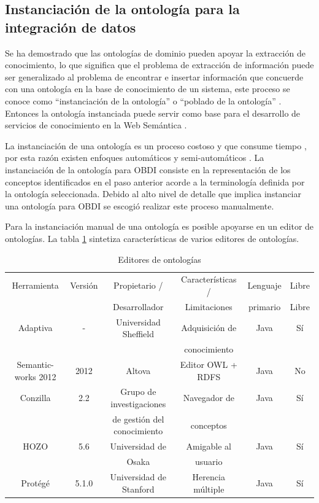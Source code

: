\subsection{Instanciación de la ontología para la integración de datos}

Se ha demostrado que las ontologías de dominio pueden apoyar la extracción de conocimiento, lo que significa que el problema de extracción de información puede ser generalizado al problema de encontrar e insertar información que concuerde con una ontología en la base de conocimiento de un sistema, este proceso se conoce como ``instanciación de la ontología'' o ``poblado de la ontología'' \citep{JANNACH2009136}. Entonces la ontología instanciada puede servir como base para el desarrollo de servicios de conocimiento en la Web Semántica \citep{1179189}.

La instanciación de una ontología es un proceso costoso y que consume tiempo \citep{10.1007/978-0-387-87685-6_30}, por esta razón existen enfoques automáticos \citep{1179189,JANNACH2009136} y semi-automáticos \citep{10.1007/978-0-387-87685-6_30}. La instanciación de la ontología para OBDI consiste en la representación de los conceptos identificados en el paso anterior acorde a la terminología definida por la ontología seleccionada. Debido al alto nivel de detalle que implica instanciar una ontología para OBDI se escogió realizar este proceso manualmente. 

Para la instanciación manual de una ontología es posible apoyarse en un editor de ontologías. La tabla \ref{tab: editores} sintetiza características de varios editores de ontologías.

\begin{table}
\begin{tabular}{|c|c|c|c|c|c|}
\hline 
Herramienta & Versión & Propietario / & Características / & Lenguaje & Libre \\ 
 &  & Desarrollador & Limitaciones & primario & Libre \\
\hline 
Adaptiva & - & Universidad Sheffield & Adquisición de & Java & Sí \\ 
 &  &  & conocimiento &  &  \\
\hline 
Semantic-works 2012 & 2012 & Altova & Editor OWL + RDFS & Java & No \\ 
\hline 
Conzilla & 2.2 & Grupo de investigaciones & Navegador de  & Java & Sí \\ 
 & & de gestión del conocimiento & conceptos &  &  \\
\hline 
HOZO & 5.6 & Universidad de & Amigable al & Java & Sí \\ 
 & & Osaka & usuario & & \\
\hline 
Protégé & 5.1.0 & Universidad de Stanford & Herencia múltiple & Java & Sí \\ 
\hline 
\end{tabular} 
\caption{Editores de ontologías}
\label{tab: editores}
\end{table}

